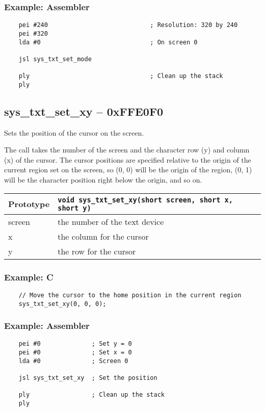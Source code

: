 \subsubsection*{Example: Assembler}
\begin{verbatim}
    pei #240							; Resolution: 320 by 240
	pei #320
    lda #0                           	; On screen 0
    
    jsl sys_txt_set_mode

    ply                                 ; Clean up the stack
	ply
\end{verbatim}


\subsection*{sys\_txt\_set\_xy -- 0xFFE0F0}
Sets the position of the cursor on the screen.

The call takes the number of the screen and the character row (y) and column (x) of the cursor. The cursor positions are specified relative to the origin of the current region set on the screen, so (0, 0) will be the origin of the region, (0, 1) will be the character position right below the origin, and so on.

\bigskip

\begin{tabular}{|l||l|} \hline
Prototype & \lstinline!void sys_txt_set_xy(short screen, short x, short y)! \\ \hline
screen & the number of the text device \\ \hline
x & the column for the cursor \\ \hline
y & the row for the cursor \\ \hline
\end{tabular}

\subsubsection*{Example: C}
\begin{lstlisting}
    // Move the cursor to the home position in the current region
    sys_txt_set_xy(0, 0, 0);
\end{lstlisting}

\subsubsection*{Example: Assembler}
\begin{verbatim}
    pei #0              ; Set y = 0
    pei #0              ; Set x = 0
    lda #0              ; Screen 0

    jsl sys_txt_set_xy  ; Set the position

    ply                 ; Clean up the stack
    ply
\end{verbatim}

